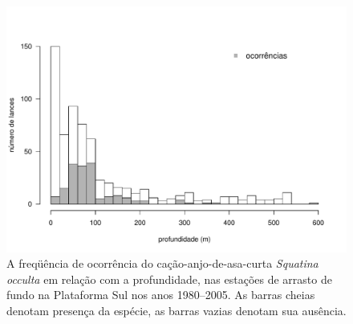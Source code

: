\documentclass[a4paper,11pt,twoside,showtrims,onecolumn,openright,final]{memoir}
\begin{document}
\begin{figure}
\begin{center}
\includegraphics[width=\textwidth]{OCCULTA_DISTRIBPROF}
\end{center}
\caption[A freqüência de ocorrência do cação-anjo-de-asa-curta \emph{Squatina occulta} 
	em relação com a profundidade, nas estações de arrasto de 
	fundo na Plataforma Sul nos anos 1980--2005]
	{A freqüência de ocorrência do cação-anjo-de-asa-curta \emph{Squatina occulta} 
	em relação com a profundidade, nas estações de arrasto de 
	fundo na Plataforma Sul nos anos 1980--2005. 
	As barras cheias denotam presença da espécie, 
	as barras vazias denotam sua ausência.}
\label{fig:fo-occulta-profundidade}
\end{figure}


%
%
\end{document}
